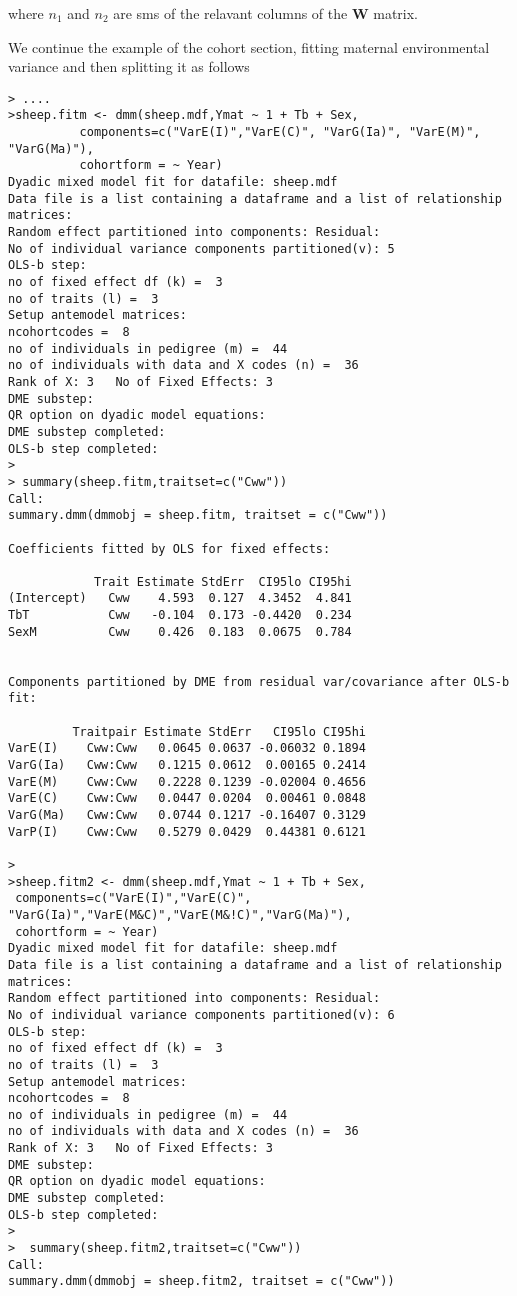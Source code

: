 \documentclass[titlepage]{article}  %
\begin{document}
where $n_{1}$ and $n_{2}$ are sms of the relavant columns of the $\bm{W}$ matrix.


We continue the example of the cohort section, fitting maternal environmental variance and then splitting it  as follows

\begin{verbatim}
> ....
>sheep.fitm <- dmm(sheep.mdf,Ymat ~ 1 + Tb + Sex,
          components=c("VarE(I)","VarE(C)", "VarG(Ia)", "VarE(M)", "VarG(Ma)"),
          cohortform = ~ Year)
Dyadic mixed model fit for datafile: sheep.mdf  
Data file is a list containing a dataframe and a list of relationship matrices:
Random effect partitioned into components: Residual:
No of individual variance components partitioned(v): 5 
OLS-b step:
no of fixed effect df (k) =  3 
no of traits (l) =  3 
Setup antemodel matrices:
ncohortcodes =  8 
no of individuals in pedigree (m) =  44 
no of individuals with data and X codes (n) =  36 
Rank of X: 3   No of Fixed Effects: 3 
DME substep:
QR option on dyadic model equations:
DME substep completed:
OLS-b step completed:
>
> summary(sheep.fitm,traitset=c("Cww"))
Call:
summary.dmm(dmmobj = sheep.fitm, traitset = c("Cww"))

Coefficients fitted by OLS for fixed effects:

            Trait Estimate StdErr  CI95lo CI95hi
(Intercept)   Cww    4.593  0.127  4.3452  4.841
TbT           Cww   -0.104  0.173 -0.4420  0.234
SexM          Cww    0.426  0.183  0.0675  0.784


Components partitioned by DME from residual var/covariance after OLS-b fit:

         Traitpair Estimate StdErr   CI95lo CI95hi
VarE(I)    Cww:Cww   0.0645 0.0637 -0.06032 0.1894
VarG(Ia)   Cww:Cww   0.1215 0.0612  0.00165 0.2414
VarE(M)    Cww:Cww   0.2228 0.1239 -0.02004 0.4656
VarE(C)    Cww:Cww   0.0447 0.0204  0.00461 0.0848
VarG(Ma)   Cww:Cww   0.0744 0.1217 -0.16407 0.3129
VarP(I)    Cww:Cww   0.5279 0.0429  0.44381 0.6121

> 
>sheep.fitm2 <- dmm(sheep.mdf,Ymat ~ 1 + Tb + Sex,
 components=c("VarE(I)","VarE(C)", "VarG(Ia)","VarE(M&C)","VarE(M&!C)","VarG(Ma)"),
 cohortform = ~ Year)
Dyadic mixed model fit for datafile: sheep.mdf  
Data file is a list containing a dataframe and a list of relationship matrices:
Random effect partitioned into components: Residual:
No of individual variance components partitioned(v): 6 
OLS-b step:
no of fixed effect df (k) =  3 
no of traits (l) =  3 
Setup antemodel matrices:
ncohortcodes =  8 
no of individuals in pedigree (m) =  44 
no of individuals with data and X codes (n) =  36 
Rank of X: 3   No of Fixed Effects: 3 
DME substep:
QR option on dyadic model equations:
DME substep completed:
OLS-b step completed:
> 
>  summary(sheep.fitm2,traitset=c("Cww"))
Call:
summary.dmm(dmmobj = sheep.fitm2, traitset = c("Cww"))


\end{verbatim}
\end{document}
